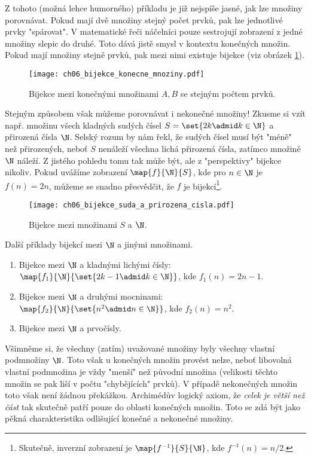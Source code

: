 Z tohoto (možná lehce humorného) příkladu je již nejspíše jasné, jak lze množiny porovnávat. Pokud mají dvě množiny stejný počet prvků, pak lze jednotlivé prvky "spárovat". V matematické řeči náčelníci pouze sestrojují zobrazení z jedné množiny slepic do druhé. Toto dává jistě smysl v kontextu konečných množin. Pokud mají množiny stejně prvků, pak mezi nimi existuje bijekce (viz obrázek \ref{fig:bijekce_konecne_mnoziny}).
\begin{figure}[h]
    \centering
    \texttt{[image: ch06\_bijekce\_konecne\_mnoziny.pdf]}
    \caption{Bijekce mezi konečnými množinami $A,B$ se stejným počtem prvků.}
    \label{fig:bijekce_konecne_mnoziny}
\end{figure}
Stejným způsobem však můžeme porovnávat i nekonečné množiny! Zkusme si vzít např. množinu všech kladných sudých čísel $S=\set{2k\admid k\in\N}$ a přirozená čísla $\N$. Selský rozum by nám řekl, že sudých čísel musí být "méně" než přirozených, neboť $S$ nenáleží všechna lichá přirozená čísla, zatímco množině $\N$ náleží. Z jistého pohledu tomu tak může být, ale z "perspektivy" bijekce nikoliv. Pokud uvážíme zobrazení $\map{f}{\N}{S}$, kde pro $n\in\N$ je $f(n)=2n$, můžeme se snadno přesvědčit, že $f$ je bijekcí\footnote{Skutečně, inverzní zobrazení je $\map{f^{-1}}{S}{\N}$, kde $f^{-1}(n)=n/2$.}.
\begin{figure}[h]
    \centering
    \texttt{[image: ch06\_bijekce\_suda\_a\_prirozena\_cisla.pdf]}
    \caption{Bijekce mezi množinami $S$ a $\N$.}
    \label{fig:bijekce_suda_a_prirozena_cisla}
\end{figure}
\begin{example}
    Další příklady bijekcí mezi $\N$ a jinými množinami.
    \begin{enumerate}[label=(\roman*)]
        \item Bijekce mezi $\N$ a kladnými lichými čísly: $\map{f_1}{\N}{\set{2k-1\admid k\in\N}}$, kde $f_1(n)=2n-1$.
        \item Bijekce mezi $\N$ a druhými mocninami: $\map{f_2}{\N}{\set{n^2\admid n\in\N}}$, kde $f_2(n)=n^2$.
        \item Bijekce mezi $\N$ a prvočísly.
    \end{enumerate}
\end{example}
Všimněme si, že všechny (zatím) uvažované množiny byly všechny vlastní podmnožiny $\N$. Toto však u konečných množin provést nelze, neboť libovolná vlastní podmnožina je vždy "menší" než původní množina (velikosti těchto množin se pak liší v počtu "chybějících" prvků). V případě nekonečných množin toto však není žádnou překážkou. Archimédův logický axiom, že \emph{celek je větší než část} tak skutečně patří pouze do oblasti konečných množin. Toto se zdá být jako pěkná charakteristika odlišující konečné a nekonečné množiny.\par

